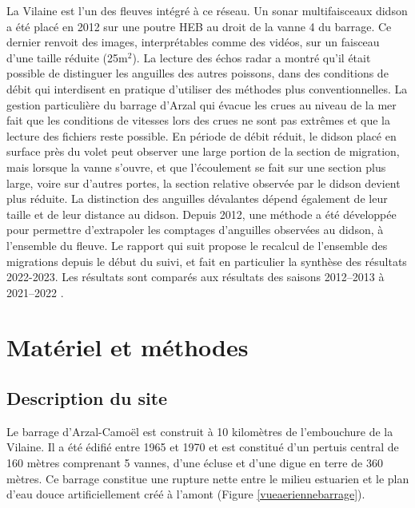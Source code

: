 \documentclass[11pt,twocolumn,titlepage,twoside]{article}
\begin{document}
La Vilaine est l'un des fleuves intégré à ce réseau.
Un sonar multifaisceaux didson a été placé  en 2012 sur une poutre HEB au droit
de la vanne 4 du barrage.
Ce dernier renvoit des images, interprétables comme des vidéos, sur un faisceau
d'une taille réduite (25m$^2$). La lecture des échos radar
a montré qu'il était possible de distinguer les
anguilles des autres poissons, dans des conditions de
débit qui interdisent en pratique d'utiliser des méthodes plus conventionnelles.
La gestion particulière du barrage d'Arzal qui évacue les crues au niveau de la
mer fait que les conditions de vitesses lors des crues ne sont pas extrêmes et
que la lecture des fichiers reste possible. 
En période de débit réduit, le didson placé en surface près du volet peut
observer une large portion de la section de migration, mais lorsque la vanne
s'ouvre, et que l'écoulement se fait sur une section plus large, voire sur
d'autres portes, la section relative observée par le didson devient plus
réduite. 
La distinction des anguilles dévalantes dépend également de leur taille et de
leur distance au didson. Depuis 2012, une méthode a été développée pour
permettre d'extrapoler les comptages d'anguilles observées au didson, à
l'ensemble du fleuve. Le rapport qui suit propose le recalcul de l'ensemble des
migrations depuis le début du suivi, et fait en particulier la synthèse des
résultats 2022-2023. Les résultats sont comparés aux résultats des saisons
2012--2013 à 2021--2022
\citep{briand_suivi_2014,briand_suivi_2015,briand_suivi_2016,briand_suivi_2017, briand_suivi_2018,briand_suivi_2019,
briand_suivi_2021, briand_suivi_2022, briand_suivi_2023}.
\section{Matériel et méthodes}



    
  








\subsection{Description du site}
Le barrage d'Arzal-Camoël est construit à 10 kilomètres de l'embouchure de la
Vilaine. Il a été édifié entre 1965 et 1970 et est constitué d'un pertuis
central de 160 mètres comprenant 5 vannes, d'une écluse et d'une digue en terre
de 360 mètres.
Ce barrage constitue une rupture nette entre le milieu estuarien et le plan d'eau douce artificiellement créé 
à l'amont (Figure \ref{vueaeriennebarrage}).
\end{document}
